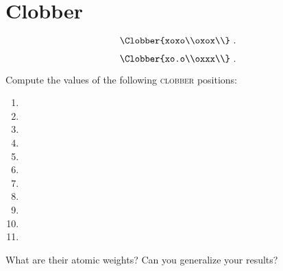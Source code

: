 \documentclass[11pt,twoside]{article}
\begin{document}
\section{Clobber}


\begin{example}
\end{example}
\[\Clobber{xoxo\\oxox\\}\ .\] 
    
\[\Clobber{xo.o\\oxxx\\}\ .\] 

\begin{problem}
    Compute the values of the following \textsc{clobber} positions: \begin{multicols}{4} \begin{enumerate} \item {} \item {} \item {} \item {} \item {} \item {} \item {} \item {} \item {} \item {} \item {} \end{enumerate} \end{multicols} What are their atomic weights? Can you generalize your results?
\end{problem}
\end{document}
